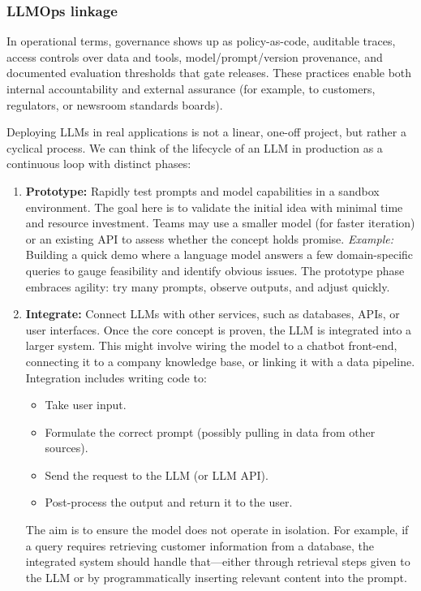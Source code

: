 \subsubsection{LLMOps linkage}
In operational terms, governance shows up as policy-as-code, auditable traces, access controls over data and tools,
model/prompt/version provenance, and documented evaluation thresholds that gate releases. These practices enable both
internal accountability and external assurance (for example, to customers, regulators, or newsroom standards boards).


Deploying LLMs in real applications is not a linear, one-off project, but rather a cyclical process. We can think of the lifecycle of an LLM in production as a continuous loop with distinct phases:

\begin{enumerate}
    \item \textbf{Prototype:} Rapidly test prompts and model capabilities in a sandbox environment.  
    The goal here is to validate the initial idea with minimal time and resource investment. Teams may use a smaller model (for faster iteration) or an existing API to assess whether the concept holds promise.  
    \noindent\emph{Example:} Building a quick demo where a language model answers a few domain-specific queries to gauge feasibility and identify obvious issues. The prototype phase embraces agility: try many prompts, observe outputs, and adjust quickly.

    \item \textbf{Integrate:} Connect LLMs with other services, such as databases, APIs, or user interfaces.  
    Once the core concept is proven, the LLM is integrated into a larger system. This might involve wiring the model to a chatbot front-end, connecting it to a company knowledge base, or linking it with a data pipeline. Integration includes writing code to:
    \begin{itemize}
        \item Take user input.
        \item Formulate the correct prompt (possibly pulling in data from other sources).
        \item Send the request to the LLM (or LLM API).
        \item Post-process the output and return it to the user.
    \end{itemize}
    The aim is to ensure the model does not operate in isolation. For example, if a query requires retrieving customer information from a database, the integrated system should handle that—either through retrieval steps given to the LLM or by programmatically inserting relevant content into the prompt.


\end{enumerate}
